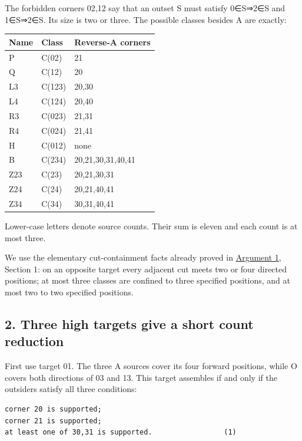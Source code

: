 \documentclass[
  10pt,
]{article}
\begin{document}
The forbidden corners 02,12 say that an outset S must satisfy 0∈S⇒2∈S
and 1∈S⇒2∈S. Its size is two or three. The possible classes besides A
are exactly:

\begin{longtable}[]{@{}lll@{}}
\toprule\noalign{}
Name & Class & Reverse-A corners \\
\midrule\noalign{}
\endhead
\bottomrule\noalign{}
\endlastfoot
P & C(02) & 21 \\
Q & C(12) & 20 \\
L3 & C(123) & 20,30 \\
L4 & C(124) & 20,40 \\
R3 & C(023) & 21,31 \\
R4 & C(024) & 21,41 \\
H & C(012) & none \\
B & C(234) & 20,21,30,31,40,41 \\
Z23 & C(23) & 20,21,30,31 \\
Z24 & C(24) & 20,21,40,41 \\
Z34 & C(34) & 30,31,40,41 \\
\end{longtable}

Lower-case letters denote source counts. Their sum is eleven and each
count is at most three.

We use the elementary cut-containment facts already proved in
\protect\hyperlink{arg-1}{Argument 1}, Section 1: on an opposite target
every adjacent cut meets two or four directed positions; at most three
classes are confined to three specified positions, and at most two to
two specified positions.

\hypertarget{three-high-targets-give-a-short-count-reduction}{%
\subsection*{2. Three high targets give a short count
reduction}\label{three-high-targets-give-a-short-count-reduction}}

First use target 01. The three A sources cover its four
forward positions, while O covers both directions of 03 and 13. This
target assembles if and only if the outsiders satisfy all three
conditions:

\begin{verbatim}
corner 20 is supported;
corner 21 is supported;
at least one of 30,31 is supported.                 (1)
\end{verbatim}
\end{document}
